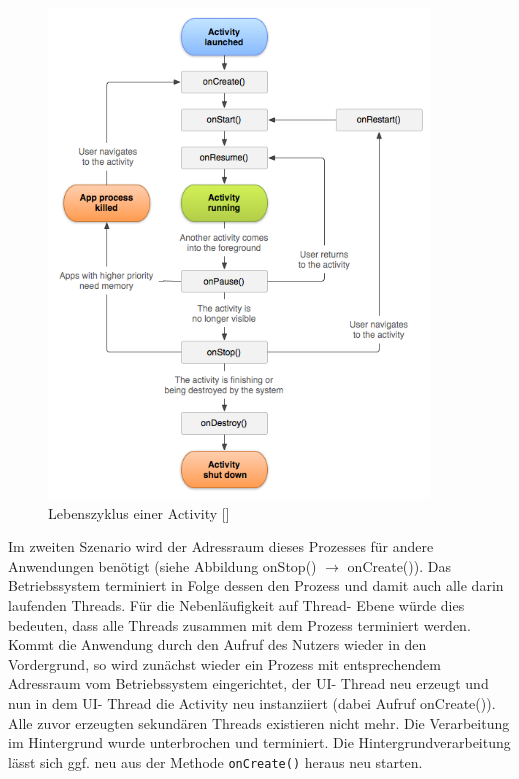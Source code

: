 \documentclass[12pt,oneside,a4paper,bibtotoc,liststotoc]{scrreprt}
\begin{document}
\begin{figure}[H]
  \begin{centering}
    \includegraphics[width=0.9\textwidth]{img/activity_lifecycle.png}
    \caption{Lebenszyklus einer Activity [\citet{androidDevDocu}]}
    \label{Activity_Lifecycle}
  \end{centering}
\end{figure}
Im zweiten Szenario wird der Adressraum dieses Prozesses für andere Anwendungen benötigt (siehe Abbildung onStop() $\rightarrow$  onCreate()). Das Betriebssystem terminiert in Folge dessen den Prozess und damit auch alle darin laufenden Threads. Für die Nebenläufigkeit auf Thread- Ebene würde dies bedeuten, dass alle Threads zusammen mit dem Prozess terminiert werden. Kommt die Anwendung durch den Aufruf des Nutzers wieder in den Vordergrund, so wird zunächst wieder ein Prozess mit entsprechendem Adressraum vom Betriebssystem eingerichtet, der UI- Thread neu erzeugt und nun in dem UI- Thread die Activity neu instanziiert (dabei Aufruf onCreate()). Alle zuvor erzeugten sekundären Threads existieren nicht mehr. Die Verarbeitung im Hintergrund wurde unterbrochen und terminiert. Die Hintergrundverarbeitung lässt sich ggf. neu aus der Methode \texttt{onCreate()} heraus neu starten.
\end{document}
